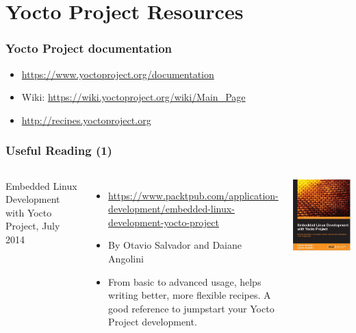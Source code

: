 \section{Yocto Project Resources}

\begin{frame}
  \frametitle{Yocto Project documentation}
  \begin{itemize}
  \item \url{https://www.yoctoproject.org/documentation}
  \item Wiki: \url{https://wiki.yoctoproject.org/wiki/Main_Page}
  \item \url{http://recipes.yoctoproject.org}
  \end{itemize}
\end{frame}

\begin{frame}
  \frametitle{Useful Reading (1)}
  \begin{columns}
    Embedded Linux Development with Yocto Project, July 2014
    \begin{itemize}
    \item \url{https://www.packtpub.com/application-development/embedded-linux-development-yocto-project}
    \item By Otavio Salvador and Daiane Angolini
    \item From basic to advanced usage, helps writing better, more
      flexible recipes. A good reference to jumpstart your Yocto
      Project development.
    \end{itemize}
    \includegraphics[width=\textwidth]{slides/yocto-resources/ELDYP.jpg}
  \end{columns}
\end{frame}

